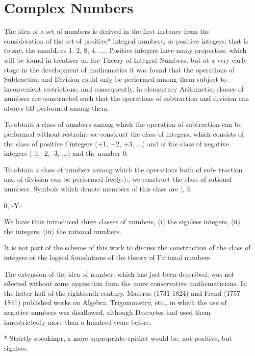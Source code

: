 \chapter{Complex Numbers} 


The idea of a set of numbers is derived in the first instance from the
consideration of the set of positive* integral numbers, or positive
integers; that is to say, the nnmbL-rs 1. 2, 8, 4, .... Positive
integers have many properties, which will be found in treatises on the
Theory of Integral Numbers; but at a very early stage in the
development of mathematics it was found that the operations of
Subtraction and Division could only be performed among them subject to
inconvenient restrictions; and consequently, in elementary
Arithmetic, classes of numbers are constructed such that the
operations of subtraction and division can always bB performed among
them.

To obtaiti a class of numbers among which the operation of subtraction
can be performed without restraint wc construct the class of integers,
which consists of the class of positive f integers (+1, +2, +3, ...)
and of the class of negative integers (-1, -2, -3, ...) and the number
0.

To obtain a class of numbers among which the operations both of sub-
traction and of division can be performed freely:):, we construct the
class of rational numbers. Symbols which denote members of this class
are |, 3,

0, -Y--

We have thus introduced three classes of numbers, (i) the signless
integers, (ii) the integers, (iii) the rational numbers.

It is not part of the scheme of this work to discuss the construction
of the class of integers or the logical foundations of the theory of
I'ational numbers .

The extension of the idea of number, which has just been described,
was not effected without some opposition from the more conservative
mathematicians. In the latter half of the eighteenth century, Maseras
(1731-1824) and Frend (1757-1841) published works on Algebra,
Trigonometry, etc., in which the use of negative numbers was
disallowed, although Descartes had used them imrestrictedly more than
a hundred years before.

* Strictly speakinpr, a more appropriate epithet would be, not
positive, but signless.

